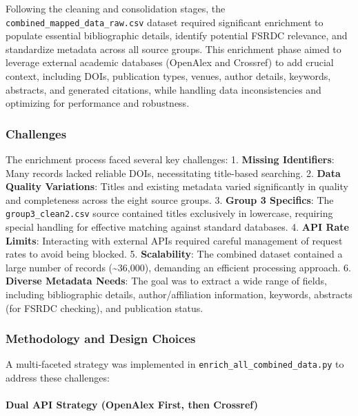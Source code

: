 \documentclass[12pt]{article}
\begin{document}
Following the cleaning and consolidation stages, the
\texttt{combined\_mapped\_data\_raw.csv} dataset required significant
enrichment to populate essential bibliographic details, identify
potential FSRDC relevance, and standardize metadata across all source
groups. This enrichment phase aimed to leverage external academic
databases (OpenAlex and Crossref) to add crucial context, including
DOIs, publication types, venues, author details, keywords, abstracts,
and generated citations, while handling data inconsistencies and
optimizing for performance and robustness.

\subsubsection{Challenges}\label{challenges}

The enrichment process faced several key challenges: 1. \textbf{Missing
Identifiers}: Many records lacked reliable DOIs, necessitating
title-based searching. 2. \textbf{Data Quality Variations}: Titles and
existing metadata varied significantly in quality and completeness
across the eight source groups. 3. \textbf{Group 3 Specifics}: The
\texttt{group3\_clean2.csv} source contained titles exclusively in
lowercase, requiring special handling for effective matching against
standard databases. 4. \textbf{API Rate Limits}: Interacting with
external APIs required careful management of request rates to avoid
being blocked. 5. \textbf{Scalability}: The combined dataset contained a
large number of records (\textasciitilde36,000), demanding an efficient
processing approach. 6. \textbf{Diverse Metadata Needs}: The goal was to
extract a wide range of fields, including bibliographic details,
author/affiliation information, keywords, abstracts (for FSRDC
checking), and publication status.

\subsubsection{Methodology and Design
Choices}\label{methodology-and-design-choices}

A multi-faceted strategy was implemented in
\texttt{enrich\_all\_combined\_data.py} to address these challenges:

\paragraph{Dual API Strategy (OpenAlex First, then
Crossref)}\label{dual-api-strategy-openalex-first-then-crossref}
\end{document}
